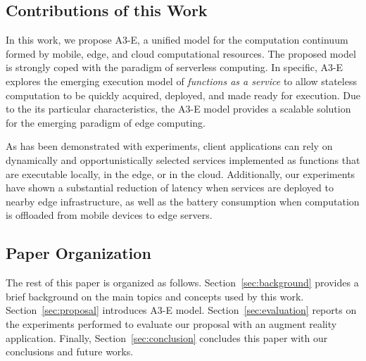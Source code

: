 \subsection{Contributions of this Work}

In this work, we propose A3-E, a unified model for the computation continuum formed by mobile, edge, and cloud computational resources. The proposed model is strongly coped with the paradigm of serverless computing. In specific, A3-E explores the emerging execution model of \textit{functions as a service} to allow stateless computation to be quickly acquired, deployed, and made ready for execution. Due to the its particular characteristics, the A3-E model provides a scalable solution for the emerging paradigm of edge computing. 

As has been demonstrated with experiments, client applications can rely on dynamically and opportunistically selected services implemented as functions that are executable locally, in the edge, or in the cloud. Additionally, our experiments have shown a substantial reduction of latency when services are deployed to nearby edge infrastructure, as well as the battery consumption when computation is offloaded from mobile devices to edge servers.


\subsection{Paper Organization}

The rest of this paper is organized as follows. Section~\ref{sec:background} provides a brief background on the main topics and concepts used by this work. Section~\ref{sec:proposal} introduces A3-E model. Section~\ref{sec:evaluation} reports on the experiments performed to evaluate our proposal with an augment reality application. Finally, Section~\ref{sec:conclusion} concludes this paper with our conclusions and future works.




